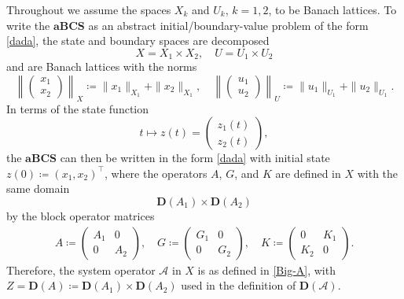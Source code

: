 \documentclass[a4paper,11pt,reqno]{amsart}
\theoremstyle{plain}
\numberwithin{equation}{section}
\begin{document}
Throughout we assume the spaces $X_k$ and $U_k$, $k=1,2$, to be Banach lattices. To write the $\mathbf{aBCS}$ as an abstract initial/boundary-value problem of the form \eqref{dada}, the state and boundary spaces are decomposed
\begin{equation*}
X = X_1\times X_{2}, \quad U= U_1 \times U_2
\end{equation*}
and are Banach lattices with the norms
\begin{equation*}
\left\|\left(\begin{matrix}
x_1\\
x_2
\end{matrix}\right)\right\|_{X}\coloneqq\|x_1\|_{X_1}+\|x_2\|_{X_1}, \quad \left\|\left(\begin{matrix}
u_1\\
u_2
\end{matrix}\right)\right\|_{U}\coloneqq\|u_1\|_{U_1}+\|u_2\|_{U_1}.
\end{equation*}
In terms of the state function
\begin{equation*}
t\mapsto z(t)=\left(\begin{matrix}
z_1(t)\\
z_2(t)
\end{matrix}\right),
\end{equation*}
the $\mathbf{aBCS}$ can then be written in the form \eqref{dada} with initial state $z(0)\coloneqq(x_1,x_2)^\top$, where the operators ${{A}}$, $G$, and $K$ are defined in $X$ with the same domain
\begin{equation*}
\bm{D}({{A}}_1)\times \bm{D}({{A}}_2)
\end{equation*}
by the block operator matrices
\begin{gather*}
{{A}}\coloneqq\left(\begin{matrix}
{{A}}_1 & 0 \\
0 & {{A}}_2
\end{matrix}\right),\quad G\coloneqq\left(\begin{matrix}
G_1 & 0 \\
0 & G_2
\end{matrix}\right),\quad K\coloneqq\left(\begin{matrix}
0 & K_1 \\
K_2 & 0
\end{matrix}\right).
\end{gather*}
Therefore, the system operator $\mathcal{A}$ in $X$ is as defined in \eqref{Big-A}, with $Z=\bm{D}(A)\coloneqq\bm{D}({{A}}_1)\times \bm{D}({{A}}_2)$ used in the definition of $\bm{D}(\mathcal{A})$.
\end{document}
